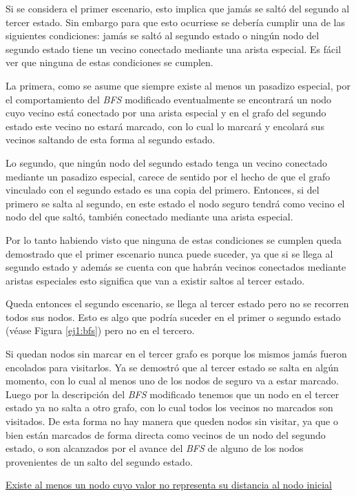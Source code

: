 	Si se considera el primer escenario, esto implica que jamás se saltó del
	segundo al tercer estado. Sin embargo para que esto ocurriese se debería
	cumplir una de las siguientes condiciones: jamás se saltó al segundo estado
	o ningún nodo del segundo estado tiene un vecino conectado mediante una
	arista especial. Es fácil ver que ninguna de estas condiciones se cumplen.

	La primera, como se asume que siempre existe al menos un pasadizo especial,
	por el comportamiento del \emph{BFS} modificado eventualmente se
	encontrará un nodo cuyo vecino está conectado por una arista especial y en el
	grafo del segundo estado este vecino no estará marcado, con lo cual lo
	marcará y encolará sus vecinos saltando de esta forma al segundo estado.

	Lo segundo, que ningún nodo del segundo estado tenga un vecino conectado
	mediante un pasadizo especial, carece de sentido por el hecho de que el
	grafo vinculado con el segundo estado es una copia del primero. Entonces, si
	del primero se salta al segundo, en este estado el nodo seguro tendrá como
	vecino el nodo del que saltó, también conectado mediante una arista
	especial.

	Por lo tanto habiendo visto que ninguna de estas condiciones se cumplen
	queda demostrado que el primer escenario nunca puede suceder, ya que si se
	llega al segundo estado y además se cuenta con que habrán vecinos conectados
	mediante aristas especiales esto significa que van a existir saltos al
	tercer estado.

	Queda entonces el segundo escenario, se llega al tercer estado pero no se
	recorren todos sus nodos. Esto es algo que podría suceder en el primer o
	segundo estado (véase Figura \ref{ej1:bfs}) pero no en el tercero.

	Si quedan nodos sin marcar en el tercer grafo es porque los mismos jamás
	fueron encolados para visitarlos. Ya se demostró que al tercer estado se
	salta en algún momento, con lo cual al menos uno de los nodos de
	seguro va a estar marcado. Luego por la descripción del \emph{BFS}
	modificado tenemos que un nodo en el tercer estado ya no salta a otro grafo,
	con lo cual todos los vecinos no marcados son visitados. De esta forma no
	hay manera que queden nodos sin visitar, ya que o bien están marcados de
	forma directa como vecinos de un nodo del segundo estado, o son alcanzados por
	el avance del \emph{BFS} de alguno de los nodos provenientes de un salto del segundo estado.

	\underline{Existe al menos un nodo cuyo valor no representa su distancia al nodo inicial}

